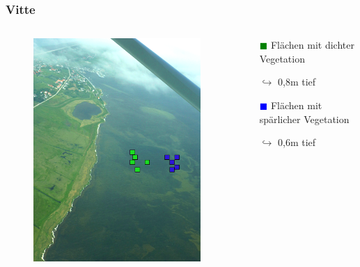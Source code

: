 \documentclass[xcolor=dvipsnames]{beamer}
\begin{document}
\begin{frame}
\frametitle{Vitte}
\begin{columns}
\begin{column}{7.5cm}
\begin{figure}
\includegraphics[height=0.8\textheight]{images/Fotos/vitte.png}
\end{figure}
\end{column}
\begin{column}{4cm}
\begin{itemize}
\item[\textcolor{green}{$\blacksquare$}] Flächen mit dichter Vegetation
\item[$ \hookrightarrow $] 0,8m tief
\item[]
\item[\textcolor{blue}{$\blacksquare$}] Flächen mit spärlicher Vegetation 
\item[$ \hookrightarrow $] 0,6m tief
\end{itemize}
\end{column}
\end{columns}
\end{frame}
\end{document}
